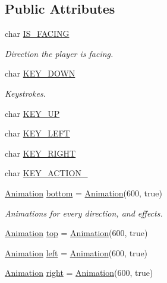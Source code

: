 \subsection*{Public Attributes}
\begin{DoxyCompactItemize}
\item 
char \hyperlink{classns_game_1_1_player_ae2def499a090256dbcc508d9b660cdce}{I\+S\+\_\+\+F\+A\+C\+I\+NG}
\begin{DoxyCompactList}\small\item\em Direction the player is facing. \end{DoxyCompactList}\item 
char \hyperlink{classns_game_1_1_player_a9c8418e477b2a3609195a0f4b9cceef8}{K\+E\+Y\+\_\+\+D\+O\+WN}
\begin{DoxyCompactList}\small\item\em Keystrokes. \end{DoxyCompactList}\item 
char \hyperlink{classns_game_1_1_player_ad51e2d88b5eaab00bcfdf787bd13c437}{K\+E\+Y\+\_\+\+UP}
\item 
char \hyperlink{classns_game_1_1_player_ac7234b6672244108f24a1a606f5b7967}{K\+E\+Y\+\_\+\+L\+E\+FT}
\item 
char \hyperlink{classns_game_1_1_player_ae3e71092e1e40488562025cd8f6484ab}{K\+E\+Y\+\_\+\+R\+I\+G\+HT}
\item 
char \hyperlink{classns_game_1_1_player_a803a385cf0a9bb45ba8c17fe66ae13d6}{K\+E\+Y\+\_\+\+A\+C\+T\+I\+O\+N\+\_}
\item 
\hyperlink{classns_game_1_1_animation}{Animation} \hyperlink{classns_game_1_1_player_a7dc24a02c5afb2d939ac8cff0c43de09}{bottom} = \hyperlink{classns_game_1_1_animation}{Animation}(600, true)
\begin{DoxyCompactList}\small\item\em Animations for every direction, and effects. \end{DoxyCompactList}\item 
\hyperlink{classns_game_1_1_animation}{Animation} \hyperlink{classns_game_1_1_player_a1ef22765b2291da72b5c695a259160ec}{top} = \hyperlink{classns_game_1_1_animation}{Animation}(600, true)
\item 
\hyperlink{classns_game_1_1_animation}{Animation} \hyperlink{classns_game_1_1_player_ac2b76c2e7ee83954f517ebd03b0f76d3}{left} = \hyperlink{classns_game_1_1_animation}{Animation}(600, true)
\item 
\hyperlink{classns_game_1_1_animation}{Animation} \hyperlink{classns_game_1_1_player_a90ec9f96623d92ed28938e3770c16936}{right} = \hyperlink{classns_game_1_1_animation}{Animation}(600, true)

\end{DoxyCompactItemize}
